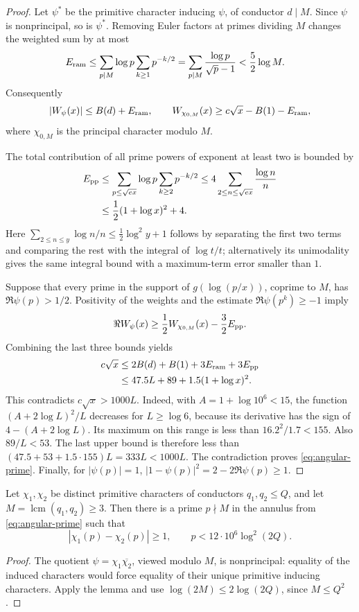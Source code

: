 \begin{proof}
Let $\psi^*$ be the primitive character inducing $\psi$, of conductor
$d\mid M$.  Since $\psi$ is nonprincipal, so is $\psi^*$.
Removing Euler factors at primes dividing $M$ changes the weighted sum by
at most
\begin{align*}
 E_{\rm ram}
 &\le\sum_{p\mid M}\log p\sum_{k\ge1}p^{-k/2}
 =\sum_{p\mid M}\frac{\log p}{\sqrt p-1}
 <\frac52\log M.
\end{align*}
Consequently
\[
 |W_\psi(x)|\le B(d)+E_{\rm ram},\qquad
 W_{\chi_{0,M}}(x)\ge c\sqrt x-B(1)-E_{\rm ram},
\]
where $\chi_{0,M}$ is the principal character modulo $M$.

The total contribution of all prime powers of exponent at least two is
bounded by
\begin{align*}
 E_{\rm pp}
 &\le\sum_{p\le\sqrt{ex}}\log p\sum_{k\ge2}p^{-k/2}
 \le4\sum_{2\le n\le\sqrt{ex}}\frac{\log n}{n}\\
 &\le\frac12(1+\log x)^2+4.
\end{align*}
Here
$\sum_{2\le n\le y}\log n/n\le\tfrac12\log^2y+1$
follows by separating the first two terms and comparing the rest with the
integral of $\log t/t$; alternatively its unimodality gives the same
integral bound with a maximum-term error smaller than $1$.

Suppose that every prime in the support of $g(\log(p/x))$, coprime to $M$,
has $\Re\psi(p)>1/2$.  Positivity of the weights and the estimate
$\Re\psi(p^k)\ge-1$ imply
\[
 \Re W_\psi(x)\ge\frac12W_{\chi_{0,M}}(x)
                                      -\frac32E_{\rm pp}.
\]
Combining the last three bounds yields
\begin{align*}
 c\sqrt x
 &\le2B(d)+B(1)+3E_{\rm ram}+3E_{\rm pp}\\
 &\le47.5L+89+1.5(1+\log x)^2.
\end{align*}
This contradicts $c\sqrt x>1000L$.  Indeed, with
$A=1+\log10^6<15$, the function
$(A+2\log L)^2/L$ decreases for $L\ge\log6$, because its derivative has
the sign of $4-(A+2\log L)$.  Its maximum on this range is less than
$16.2^2/1.7<155$.  Also $89/L<53$.  The last upper bound is therefore
less than $(47.5+53+1.5\cdot155)L=333L<1000L$.
The contradiction proves \eqref{eq:angular-prime}.  Finally, for
$|\psi(p)|=1$, $|1-\psi(p)|^2=2-2\Re\psi(p)\ge1$.
\end{proof}

\begin{corollary}
Let $\chi_1,\chi_2$ be distinct primitive characters of conductors
$q_1,q_2\le Q$, and let $M=\operatorname{lcm}(q_1,q_2)\ge3$.
Then there is a prime $p\nmid M$ in the annulus from
\eqref{eq:angular-prime} such that
\[
 |\chi_1(p)-\chi_2(p)|\ge1,
 \qquad
 p<12\cdot10^6\log^2(2Q).
\]
\end{corollary}

\begin{proof}
The quotient $\psi=\chi_1\overline{\chi_2}$, viewed modulo $M$, is
nonprincipal: equality of the induced characters would force equality of
their unique primitive inducing characters.  Apply the lemma and use
$\log(2M)\le2\log(2Q)$, since $M\le Q^2$.
\end{proof}

